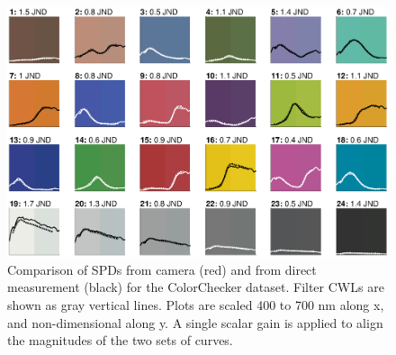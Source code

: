 \documentclass[twocolumn,10pt]{asme2ej}
\begin{document}
\begin{figure}[H]
\centering
  \includegraphics[width=0.90\linewidth]{SPD_validation.eps}
  \caption{Comparison of SPDs from camera (red) and from direct measurement (black) for the ColorChecker dataset. Filter CWLs are shown as gray vertical lines. Plots are scaled 400 to 700 nm along x, and non-dimensional along y. A single scalar gain is applied to align the magnitudes of the two sets of curves.}
  \label{SPD_validation}
\end{figure}
\end{document}
